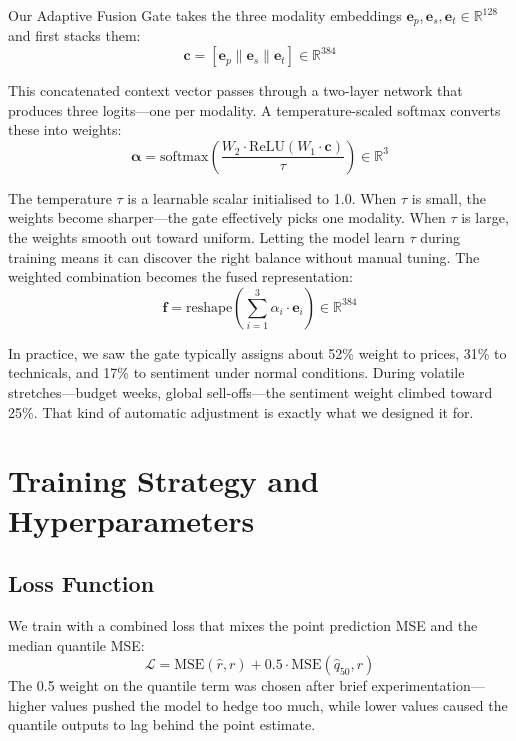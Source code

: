 \documentclass[conference]{IEEEtran}
\begin{document}
Our Adaptive Fusion Gate takes the three modality embeddings $\mathbf{e}_p, \mathbf{e}_s, \mathbf{e}_t \in \mathbb{R}^{128}$ and first stacks them:
\begin{equation}
\mathbf{c} = [\mathbf{e}_p \| \mathbf{e}_s \| \mathbf{e}_t] \in \mathbb{R}^{384}
\end{equation}

This concatenated context vector passes through a two-layer network that produces three logits---one per modality. A temperature-scaled softmax converts these into weights:
\begin{equation}
\boldsymbol{\alpha} = \text{softmax}\left(\frac{W_2 \cdot \text{ReLU}(W_1 \cdot \mathbf{c})}{\tau}\right) \in \mathbb{R}^{3}
\end{equation}

The temperature $\tau$ is a learnable scalar initialised to 1.0. When $\tau$ is small, the weights become sharper---the gate effectively picks one modality. When $\tau$ is large, the weights smooth out toward uniform. Letting the model learn $\tau$ during training means it can discover the right balance without manual tuning. The weighted combination becomes the fused representation:
\begin{equation}
\mathbf{f} = \text{reshape}\left(\sum_{i=1}^{3} \alpha_i \cdot \mathbf{e}_i\right) \in \mathbb{R}^{384}
\end{equation}

In practice, we saw the gate typically assigns about 52\% weight to prices, 31\% to technicals, and 17\% to sentiment under normal conditions. During volatile stretches---budget weeks, global sell-offs---the sentiment weight climbed toward 25\%. That kind of automatic adjustment is exactly what we designed it for.

\section{Training Strategy and Hyperparameters}

\subsection{Loss Function}
We train with a combined loss that mixes the point prediction MSE and the median quantile MSE:
\begin{equation}
\mathcal{L} = \text{MSE}(\hat{r}, r) + 0.5 \cdot \text{MSE}(\hat{q}_{50}, r)
\end{equation}
The 0.5 weight on the quantile term was chosen after brief experimentation---higher values pushed the model to hedge too much, while lower values caused the quantile outputs to lag behind the point estimate.
\end{document}
